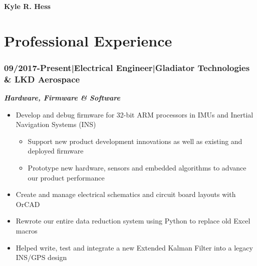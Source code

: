 \documentclass[]{article}
\begin{document}
\begin{singlespace}
\noindent\textbf{\huge{Kyle R. Hess}}
\hfill \break
\noindent\makebox[\linewidth]{\rule{\textwidth}{1pt}}


\section*{Professional Experience}

\subsubsection*{09/2017-Present\hspace{3 mm}|\hspace{3 mm}Electrical Engineer\hspace{3 mm}|\hspace{3 mm}Gladiator Technologies \& LKD Aerospace}
\textbf{\emph{Hardware, Firmware \& Software}}
\vspace{-2mm}
\begin{itemize}
    \setlength\itemsep{0em}
    \item Develop and debug firmware for 32-bit ARM processors in IMUs and Inertial Navigation Systems (INS)
    \vspace{-2mm}
    \begin{itemize}
        \setlength\itemsep{0em}
        \item Support new product development innovations as well as existing and deployed firmware 
        \item Prototype new hardware, sensors and embedded algorithms to advance our product performance
    \end{itemize}
    \item Create and manage electrical schematics and circuit board layouts with OrCAD
    \item Rewrote our entire data reduction system using Python to replace old Excel macros
    \item Helped write, test and integrate a new Extended Kalman Filter into a legacy INS/GPS design
\end{itemize}


\end{singlespace}
\end{document}
